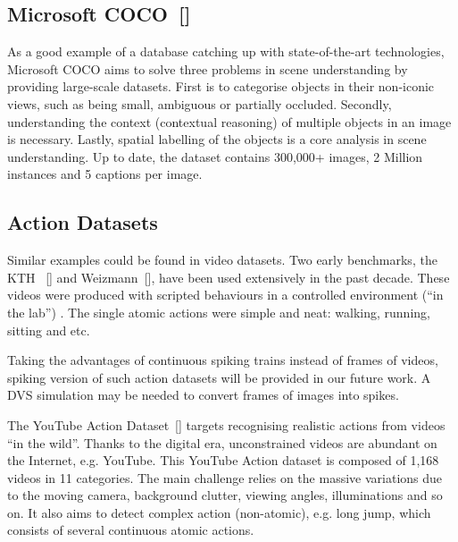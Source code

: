 \subsection{Microsoft COCO~[\cite{lin_microsoft_2014}]}
As a good example of a database catching up with state-of-the-art technologies, Microsoft COCO aims to solve three problems in scene understanding by providing large-scale datasets.
First is to categorise objects in their non-iconic views, such as being small, ambiguous or partially occluded.
Secondly, understanding the context (contextual reasoning) of multiple objects in an image is necessary.
Lastly, spatial labelling of the objects is a core analysis in scene understanding.
Up to date, the dataset contains 300,000+ images, 2 Million instances and 5 captions per image.

\subsection{Action Datasets}
Similar examples could be found in video datasets.
Two early benchmarks, the KTH ~[\cite{schuldt2004recognizing}] and Weizmann~[\cite{blank2005actions}], have been used extensively in the past decade. 
These videos were produced with scripted behaviours in a controlled environment (``in the lab'') .
The single atomic actions were simple and neat: walking, running, sitting and etc.

Taking the advantages of continuous spiking trains instead of frames of videos, spiking version of such action datasets will be provided in our future work.
A DVS simulation may be needed to convert frames of images into spikes.
 
The YouTube Action Dataset~[\cite{liu_recognizing_2009}] targets recognising realistic actions from videos ``in the wild''.
Thanks to the digital era, unconstrained videos are abundant on the Internet, e.g. YouTube.
This YouTube Action dataset is composed of 1,168 videos in 11 categories.
The main challenge relies on the massive variations due to the moving camera, background clutter, viewing angles, illuminations and so on.
It also aims to detect complex action (non-atomic), e.g. long jump, which consists of several continuous atomic actions.

